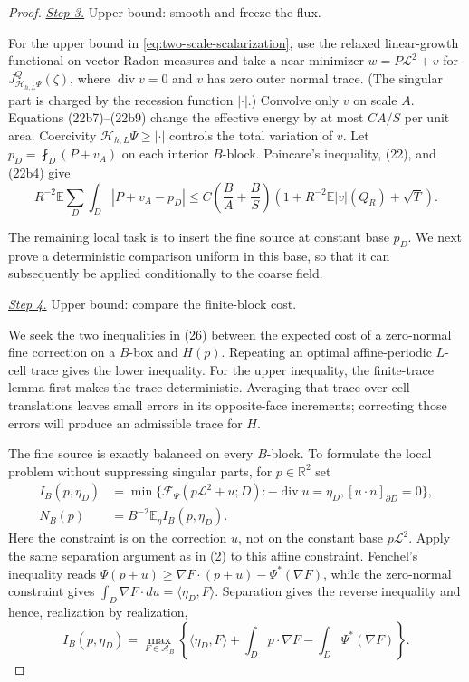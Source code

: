 \documentclass{aomart}
\theoremstyle{definition}
\newcommand{\1}{\mathbf 1}
\begin{document}
\begin{proof}
\smallskip\noindent
\underline{\textit{Step 3.}} Upper bound: smooth and freeze the flux.

For the upper bound in \eqref{eq:two-scale-scalarization}, use the relaxed linear-growth functional on
vector Radon measures and take a near-minimizer
$w=P\mathcal L^2+v$ for
$J_ {\mathcal H_ {h,L}\Psi}^Q(\zeta)$, where
$\operatorname {div}v=0$ and $v$ has zero outer normal trace.
(The singular part is charged by the recession
function $|\cdot|$.) Convolve only $v$ on scale $A$.  Equations
(22b7)--(22b9) change the effective energy by at most $CA/S$ per unit
area.  Coercivity
$\mathcal H_ {h,L}\Psi\geq|\cdot|$ controls the total variation of $v$.
Let $p_ D=\fint_ D(P+v_ A)$ on each interior $B$-block.  Poincare's
inequality, (22), and (22b4) give
\begin{equation}
R^{-2}\mathbb E\sum_ D\int_ D|P+v_ A-p_ D|
\leq C\left(\frac BA+\frac BS\right)
\left(1+R^{-2}\mathbb E|v|(Q_ R)+\sqrt T\right).
\tag{25}
\end{equation}

The remaining local task is to insert the fine source at constant base
$p_D$.  We next prove a deterministic comparison uniform in this base,
so that it can subsequently be applied conditionally to the coarse field.

\smallskip\noindent
\underline{\textit{Step 4.}} Upper bound: compare the finite-block cost.

We seek the two inequalities in (26) between the expected cost of a
zero-normal fine correction on a $B$-box and $H(p)$.  Repeating an
optimal affine-periodic $L$-cell trace gives the lower inequality.  For
the upper inequality, the finite-trace lemma first makes the trace
deterministic.  Averaging that trace over cell translations leaves small
errors in its opposite-face increments; correcting those errors will
produce an admissible trace for $H$.

The fine source is exactly balanced on every $B$-block.  To formulate
the local problem without suppressing singular parts, for $p\in
\mathbb R^2$ set
\begin{equation}
\begin{split}
I_ B(p,\eta_ D)&=\min\{\mathcal F_ \Psi(p\mathcal L^2+u;D):
-\operatorname {div}u=\eta_ D, [u\cdot n]_ {\partial D}=0\},\\
N_ B(p)&=B^{-2}\mathbb E_ \eta I_ B(p,\eta_ D).                    
\end{split}
\tag{25a0}
\end{equation}
Here the constraint is on the correction $u$, not on the constant
base $p\mathcal L^2$.  Apply the same separation argument as in (2)
to this affine constraint.  Fenchel's inequality reads
$\Psi(p+u)\geq\nabla F\cdot(p+u)-\Psi^*(\nabla F)$, while the
zero-normal constraint gives
$\int_ D\nabla F\cdot du=\langle\eta_ D,F\rangle$.  Separation gives
the reverse inequality and hence, realization by realization,
\begin{equation}
I_ B(p,\eta_ D)=\max_ {F\in\mathscr A_ B}
\left\{\langle\eta_ D,F\rangle+
\int_ Dp\cdot\nabla F-\int_ D\Psi^*(\nabla F)\right\}.
\tag{25a1}
\end{equation}


\end{proof}
\end{document}
